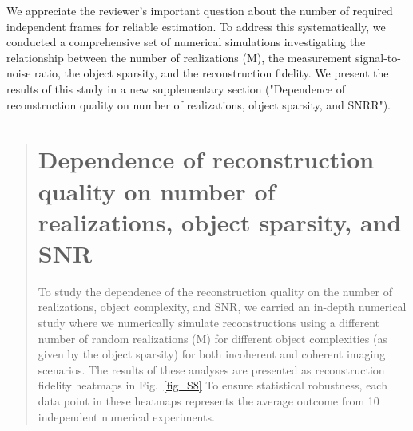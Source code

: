 \documentclass[12pt]{article}
\newcommand{\hlred}[1]{\sethlcolor{red!30}\hl{#1}}
\newenvironment{ourresponse}
    {\begin{tcolorbox}[width=\linewidth,breakable,enhanced,colback=gray!5,colframe=responsecolor!50,title=Response,left=5pt,right=5pt]}
    {\end{tcolorbox}}
\begin{document}
\begin{ourresponse}
    We appreciate the reviewer's important question about the number of required independent frames for reliable estimation. To address this systematically, we conducted a comprehensive set of numerical simulations investigating the relationship between the number of realizations (M), the measurement signal-to-noise ratio, the object sparsity, and the reconstruction fidelity. We present the results of this study in a new supplementary section ("Dependence of reconstruction quality on number of realizations, object sparsity, and SNRR").


    
    
    
    \begin{quote}
        \section*{Dependence of reconstruction quality on number of realizations, object sparsity, and SNR}


        
        To study the dependence of the reconstruction quality on the number of realizations, object complexity, and SNR, we carried an in-depth numerical study where we numerically simulate reconstructions using a different number of random realizations (M) for different object complexities (as given by the object sparsity) for both incoherent and coherent imaging scenarios.
        The results of these analyses are presented as reconstruction fidelity heatmaps in Fig.~\ref{fig_S8}
        To ensure statistical robustness, each data point in these heatmaps represents the average outcome from 10 independent numerical experiments.


\end{quote}
\end{ourresponse}
\end{document}
